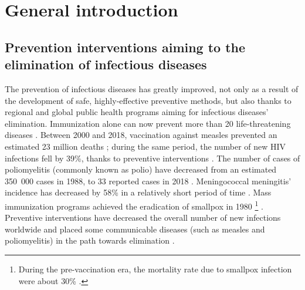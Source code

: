 \chapter{General introduction} 
\label{Introduction} 


\section{Prevention interventions aiming to the elimination of infectious diseases}
\label{Intro:Prevention}

The prevention of infectious diseases has greatly improved, not only as a result of the development of safe, highly-effective preventive %
methods, but also thanks to regional and global public health programs aiming for infectious diseases' elimination. Immunization alone can now prevent more than 20 life-threatening diseases \cite[]{WHO_IA2030}. Between 2000 and 2018, vaccination against measles %
prevented an estimated 23 million deaths \cite[]{WHO_Factsheet_Measles}; during the same period, the number of new HIV infections fell by 39\%, thanks to preventive interventions \cite[]{WHO_Factsheet_HIV}. The number of cases of poliomyelitis %
(commonly known as polio) have decreased from an estimated 350~000 cases in 1988, to 33 reported cases in 2018 \cite[]{WHO_Factsheet_Polio}. Meningococcal meningitis' %
incidence has decreased by 58\% in a relatively short period of time \cite[]{WHO_Factsheet_Meningitis}. Mass immunization programs achieved the eradication of smallpox in 1980%
\footnote{During the pre-vaccination era, the mortality rate due to smallpox infection were about 30\% \cite[]{CDC_Smallpox2001}.}
 \cite[]{CDC_Smallpox2001}. Preventive interventions have decreased the overall number of new infections worldwide \cite[]{CDC_10achievements} and placed some communicable diseases (such as measles and poliomyelitis) in the path towards elimination \cite[]{CDC_10achievements}. 
 
